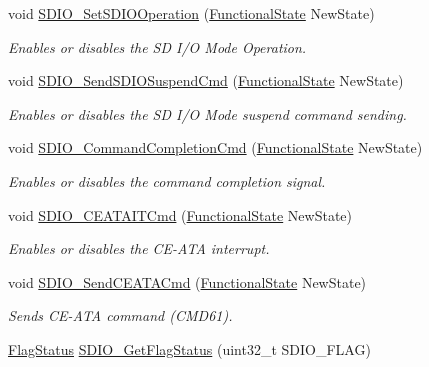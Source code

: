 \begin{DoxyCompactItemize}
void \hyperlink{group___s_d_i_o___exported___functions_ga24e210c185d5a7855cbaff4472a8f8d1}{S\+D\+I\+O\+\_\+\+Set\+S\+D\+I\+O\+Operation} (\hyperlink{group___exported__types_gac9a7e9a35d2513ec15c3b537aaa4fba1}{Functional\+State} New\+State)
\begin{DoxyCompactList}\small\item\em Enables or disables the SD I/O Mode Operation. \end{DoxyCompactList}\item 
void \hyperlink{group___s_d_i_o___exported___functions_ga9264137a01a1ab81d03bc80a3b3120fc}{S\+D\+I\+O\+\_\+\+Send\+S\+D\+I\+O\+Suspend\+Cmd} (\hyperlink{group___exported__types_gac9a7e9a35d2513ec15c3b537aaa4fba1}{Functional\+State} New\+State)
\begin{DoxyCompactList}\small\item\em Enables or disables the SD I/O Mode suspend command sending. \end{DoxyCompactList}\item 
void \hyperlink{group___s_d_i_o___exported___functions_ga1bbe98c629812bc62121d9c8b2c5e21b}{S\+D\+I\+O\+\_\+\+Command\+Completion\+Cmd} (\hyperlink{group___exported__types_gac9a7e9a35d2513ec15c3b537aaa4fba1}{Functional\+State} New\+State)
\begin{DoxyCompactList}\small\item\em Enables or disables the command completion signal. \end{DoxyCompactList}\item 
void \hyperlink{group___s_d_i_o___exported___functions_gab44b8cbc21be000a291563076159503b}{S\+D\+I\+O\+\_\+\+C\+E\+A\+T\+A\+I\+T\+Cmd} (\hyperlink{group___exported__types_gac9a7e9a35d2513ec15c3b537aaa4fba1}{Functional\+State} New\+State)
\begin{DoxyCompactList}\small\item\em Enables or disables the C\+E-\/\+A\+TA interrupt. \end{DoxyCompactList}\item 
void \hyperlink{group___s_d_i_o___exported___functions_ga8dc7f17804bdb745b42f6647c8487b4c}{S\+D\+I\+O\+\_\+\+Send\+C\+E\+A\+T\+A\+Cmd} (\hyperlink{group___exported__types_gac9a7e9a35d2513ec15c3b537aaa4fba1}{Functional\+State} New\+State)
\begin{DoxyCompactList}\small\item\em Sends C\+E-\/\+A\+TA command (C\+M\+D61). \end{DoxyCompactList}\item 
\hyperlink{group___exported__types_ga89136caac2e14c55151f527ac02daaff}{Flag\+Status} \hyperlink{group___s_d_i_o___exported___functions_ga644514b4b3c95c5c4326d99cd166f6f9}{S\+D\+I\+O\+\_\+\+Get\+Flag\+Status} (uint32\+\_\+t S\+D\+I\+O\+\_\+\+F\+L\+AG)

\end{DoxyCompactItemize}
